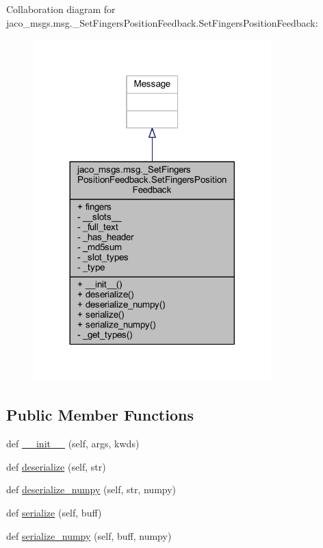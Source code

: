 Collaboration diagram for jaco\+\_\+msgs.\+msg.\+\_\+\+Set\+Fingers\+Position\+Feedback.\+Set\+Fingers\+Position\+Feedback\+:
\nopagebreak
\begin{figure}[H]
\begin{center}
\leavevmode
\includegraphics[width=260pt]{d3/d78/classjaco__msgs_1_1msg_1_1__SetFingersPositionFeedback_1_1SetFingersPositionFeedback__coll__graph}
\end{center}
\end{figure}
\subsection*{Public Member Functions}
\begin{DoxyCompactItemize}
\item 
def \hyperlink{classjaco__msgs_1_1msg_1_1__SetFingersPositionFeedback_1_1SetFingersPositionFeedback_a9f8cfcda6cb4f867ebb512adbbce9242}{\+\_\+\+\_\+init\+\_\+\+\_\+} (self, args, kwds)
\item 
def \hyperlink{classjaco__msgs_1_1msg_1_1__SetFingersPositionFeedback_1_1SetFingersPositionFeedback_a0f288adfc2c91725afaa4cae33356686}{deserialize} (self, str)
\item 
def \hyperlink{classjaco__msgs_1_1msg_1_1__SetFingersPositionFeedback_1_1SetFingersPositionFeedback_a11688b3d97266d0a4aaa4dc75b60c02a}{deserialize\+\_\+numpy} (self, str, numpy)
\item 
def \hyperlink{classjaco__msgs_1_1msg_1_1__SetFingersPositionFeedback_1_1SetFingersPositionFeedback_aa968166ca70e824d18bd231ae8f2ddd7}{serialize} (self, buff)
\item 
def \hyperlink{classjaco__msgs_1_1msg_1_1__SetFingersPositionFeedback_1_1SetFingersPositionFeedback_ad1e1605c6e628606b1591b43bd1ee9fb}{serialize\+\_\+numpy} (self, buff, numpy)
\end{DoxyCompactItemize}
